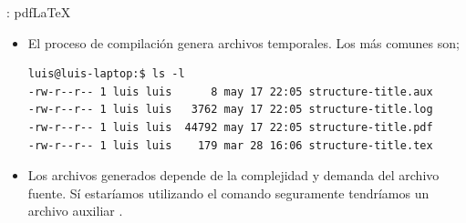 \documentclass[draft]{beamer}
\begin{document}
\begin{frame}[fragile]{\insertsection: pdf\LaTeX{}}
  \begin{itemize}
  \item El proceso de compilación genera archivos temporales. Los más
    comunes son;
    \begin{center}
      \begin{verbatim}
luis@luis-laptop:$ ls -l
-rw-r--r-- 1 luis luis      8 may 17 22:05 structure-title.aux
-rw-r--r-- 1 luis luis   3762 may 17 22:05 structure-title.log
-rw-r--r-- 1 luis luis  44792 may 17 22:05 structure-title.pdf
-rw-r--r-- 1 luis luis    179 mar 28 16:06 structure-title.tex
      \end{verbatim}
    \end{center}
  \item Los archivos generados depende de la complejidad y demanda
    del archivo fuente. Sí estaríamos utilizando el comando
     seguramente tendríamos un archivo
    auxiliar .
  \end{itemize}
\end{frame}
\end{document}
